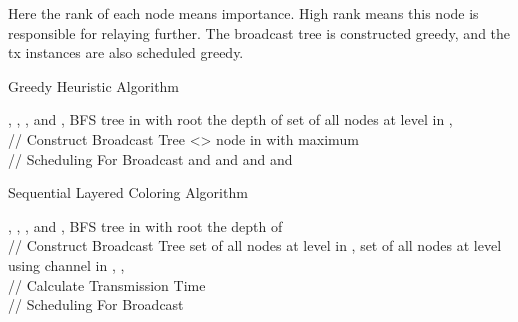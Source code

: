 \documentclass[10pt, conference]{IEEEtran}
\begin{document}
Here the rank of each node means importance. High rank means
this node is responsible for relaying further. The broadcast
tree is constructed greedy, and the tx instances are also
scheduled greedy.


\begin{algorithm}[htb]
\caption{Greedy Heuristic Algorithm}
\label{A1}
\begin{algorithmic}[1]
\REQUIRE , , , and 
\ENSURE , 
\STATE  BFS tree in  with root 
\STATE  the depth of 
\STATE  set of all nodes at level  in
, 
    \STATE 
    \STATE 
    \STATE 
\ENDFOR\\
// Construct Broadcast Tree
\STATE 
{}
    \STATE 
    \STATE 
    \WHILE {}
        \STATE <> node in  with maximum   
        \STATE   
        \STATE   
            \STATE 
        \ENDFOR
        \STATE  
        \STATE 
    \ENDWHILE
\ENDFOR \\
// Scheduling For Broadcast
\STATE 
\STATE 
\STATE 
\WHILE {}
    \STATE 
    \STATE 
    \STATE    and  and 
    \WHILE {}
        \STATE 
        \STATE 
        \STATE 
        \STATE 
            \STATE 
        \ENDFOR
        \STATE   and  and 
    \ENDWHILE
\ENDWHILE
\end{algorithmic}
\end{algorithm}

\begin{algorithm}[htb]
\caption{Sequential Layered Coloring Algorithm}
\label{A2}
\begin{algorithmic}[1]
\REQUIRE , , , and 
\ENSURE , 
\STATE  BFS tree in  with root 
\STATE  the depth of 
        \STATE 
    \ENDFOR
\ENDFOR\\
// Construct Broadcast Tree
    \STATE  set of all nodes at level  in
, 
    \STATE  set of all nodes at level  using channel  in
, , 
    \STATE 
            \STATE 
            \IF {()}
                \STATE 
            \ENDIF
        \ENDFOR
        \STATE 
        \STATE 
    \ENDFOR
\ENDFOR\\
// Calculate Transmission Time
        \STATE 
            \STATE 
            \STATE 
        \ENDFOR
        \STATE 
        \STATE 
            \STATE 
            \STATE 
        \ENDFOR
    \ENDFOR
\ENDFOR\\
// Scheduling For Broadcast
\STATE 
{}
        \STATE 
            \STATE 
        \ENDFOR
        \STATE 
    \ENDFOR
            \STATE 
        \ENDFOR
    \ENDFOR
\ENDFOR
\end{algorithmic}
\end{algorithm}
\end{document}
